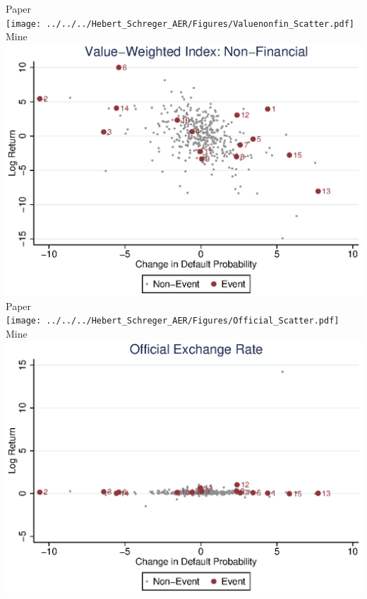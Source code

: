 \documentclass{article}
\begin{document}
\newpage Paper \\
\texttt{[image: ../../../Hebert\_Schreger\_AER/Figures/Valuenonfin\_Scatter.pdf]}\\
Mine \\
\includegraphics[scale = .8]{Valuenonfin_Scatter.eps}\\

\newpage Paper \\
\texttt{[image: ../../../Hebert\_Schreger\_AER/Figures/Official\_Scatter.pdf]}\\
Mine \\
\includegraphics[scale = .8]{Official_Scatter.eps}\\
\end{document}
